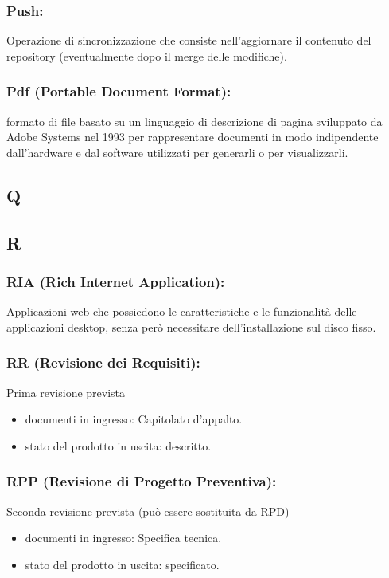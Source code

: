 \subsubsection*{Push:} Operazione di sincronizzazione che consiste
nell'aggiornare il contenuto del repository (eventualmente dopo il merge delle modifiche).

\subsubsection*{Pdf (Portable Document Format):} formato di file basato su un
linguaggio di descrizione di pagina sviluppato da Adobe Systems nel 1993 per rappresentare
documenti in modo indipendente dall'hardware e dal software utilizzati per generarli o per visualizzarli.

\subsection*{\huge{Q}}
\subsection*{\huge{R}}
\subsubsection*{RIA (Rich Internet Application):} Applicazioni web che
possiedono le caratteristiche e le funzionalit\`a delle applicazioni desktop, senza per\`o
necessitare dell'installazione sul disco fisso.

\subsubsection*{RR (Revisione dei Requisiti):}  Prima revisione prevista 
\begin{itemize}
\item documenti in ingresso: Capitolato d'appalto.
\item stato del prodotto in uscita: descritto. 
\end{itemize}

\subsubsection*{RPP (Revisione di Progetto Preventiva):} Seconda revisione
prevista (pu\`o essere sostituita da RPD)
\begin{itemize}
\item documenti in ingresso: Specifica tecnica.
\item stato del prodotto in uscita: specificato. 
\end{itemize}


